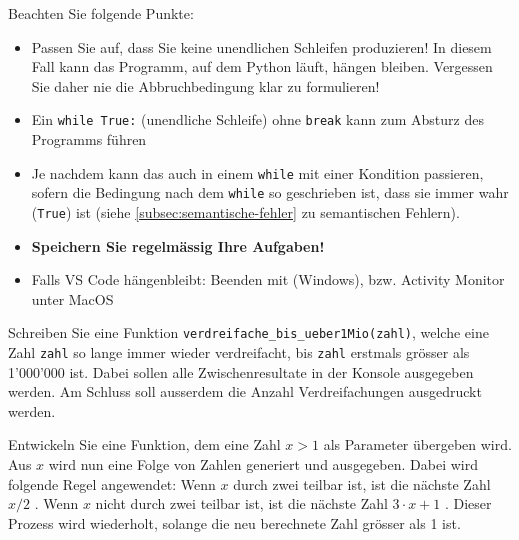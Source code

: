 \begin{myattention}
	Beachten Sie folgende Punkte:
	\begin{itemize}
		\item Passen Sie auf, dass Sie keine unendlichen Schleifen produzieren! In diesem Fall kann das Programm, auf dem Python läuft, hängen bleiben. Vergessen Sie daher nie die Abbruchbedingung klar zu formulieren!
		\item Ein \lstinline|while True:| (unendliche Schleife) ohne \lstinline|break| kann zum Absturz des Programms führen 
		\item Je nachdem kann das auch in einem \lstinline|while| mit einer Kondition passieren, sofern die Bedingung nach dem \lstinline|while| so geschrieben ist, dass sie immer wahr (\lstinline|True|) ist (siehe \cref{subsec:semantische-fehler} zu semantischen Fehlern).
		\item \textbf{Speichern Sie regelmässig Ihre Aufgaben!}
		\item Falls VS Code hängenbleibt: Beenden mit  (Windows), bzw. Activity Monitor unter MacOS
	\end{itemize}
\end{myattention}

\begin{myexercise}
	Schreiben Sie eine Funktion \lstinline|verdreifache_bis_ueber1Mio(zahl)|, welche eine Zahl \texttt{zahl} so lange immer wieder verdreifacht, bis \texttt{zahl} erstmals grösser als 1'000'000 ist. Dabei sollen alle Zwischenresultate in der Konsole ausgegeben werden. Am Schluss soll ausserdem die Anzahl Verdreifachungen ausgedruckt werden.
	\begin{myanswer}
		
	\end{myanswer}
\end{myexercise}

\begin{myexercise}
	Entwickeln Sie eine Funktion, dem eine Zahl $x > 1$ als Parameter übergeben wird. Aus $x$ wird nun eine Folge von Zahlen generiert und ausgegeben. Dabei wird folgende Regel angewendet: Wenn $x$ durch zwei teilbar ist, ist die nächste Zahl $x / 2$ . Wenn $x$ nicht durch zwei teilbar ist, ist die nächste Zahl $3 \cdot x + 1$ . Dieser Prozess wird wiederholt, solange die neu berechnete Zahl grösser als 1 ist.
	\begin{myanswer}
		
	\end{myanswer}
\end{myexercise}

